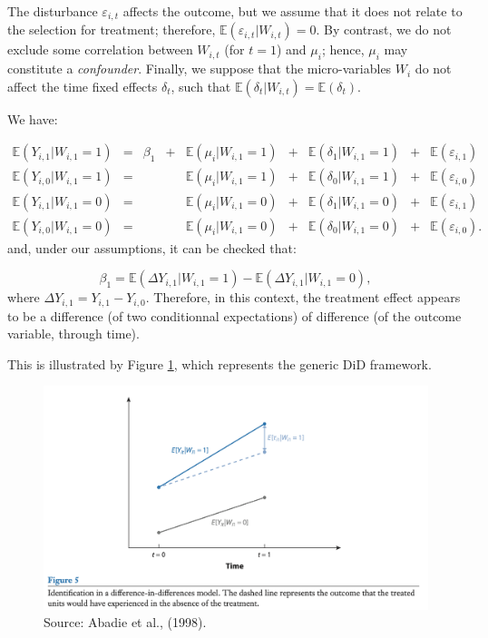 \documentclass[
  12pt,
]{book}
\theoremstyle{definition}
\theoremstyle{definition}
\theoremstyle{definition}
\theoremstyle{definition}
\theoremstyle{remark}
\begin{document}
The disturbance \(\varepsilon_{i,t}\) affects the outcome, but we assume that it does not relate to the selection for treatment; therefore, \(\mathbb{E}(\varepsilon_{i,t}|W_{i,t})=0\). By contrast, we do not exclude some correlation between \(W_{i,t}\) (for \(t=1\)) and \(\mu_i\); hence, \(\mu_i\) may constitute a \emph{confounder}. Finally, we suppose that the micro-variables \(W_i\) do not affect the time fixed effects \(\delta_t\), such that \(\mathbb{E}(\delta_t|W_{i,t})=\mathbb{E}(\delta_t)\).

We have:

\[
\begin{array}{cccccccccc}
\mathbb{E}(Y_{i,1}|W_{i,1}=1) &=& \beta_1 &+& \mathbb{E}(\mu_i|W_{i,1}=1) &+&\mathbb{E}(\delta_1|W_{i,1}=1) &+& \mathbb{E}(\varepsilon_{i,1}) \\
\mathbb{E}(Y_{i,0}|W_{i,1}=1) &=&  && \mathbb{E}(\mu_i|W_{i,1}=1) &+&\mathbb{E}(\delta_0|W_{i,1}=1) &+& \mathbb{E}(\varepsilon_{i,0}) \\
\mathbb{E}(Y_{i,1}|W_{i,1}=0) &=& && \mathbb{E}(\mu_i|W_{i,1}=0) &+&\mathbb{E}(\delta_1|W_{i,1}=0) &+& \mathbb{E}(\varepsilon_{i,1}) \\
\mathbb{E}(Y_{i,0}|W_{i,1}=0) &=&  && \mathbb{E}(\mu_i|W_{i,1}=0) &+&\mathbb{E}(\delta_0|W_{i,1}=0) &+& \mathbb{E}(\varepsilon_{i,0}).
\end{array}
\]
and, under our assumptions, it can be checked that:

\[
\beta_1 = \mathbb{E}(\Delta Y_{i,1}|W_{i,1}=1) - \mathbb{E}(\Delta Y_{i,1}|W_{i,1}=0),
\]
where \(\Delta Y_{i,1}=Y_{i,1}-Y_{i,0}\). Therefore, in this context, the treatment effect appears to be a difference (of two conditionnal expectations) of difference (of the outcome variable, through time).

This is illustrated by Figure \ref{fig:figAbadie}, which represents the generic DiD framework.

\begin{figure}

{\centering \includegraphics[width=0.95\linewidth]{images/Abadie_et_al_2018} 

}

\caption{Source: Abadie et al., (1998).}\label{fig:figAbadie}
\end{figure}
\end{document}
